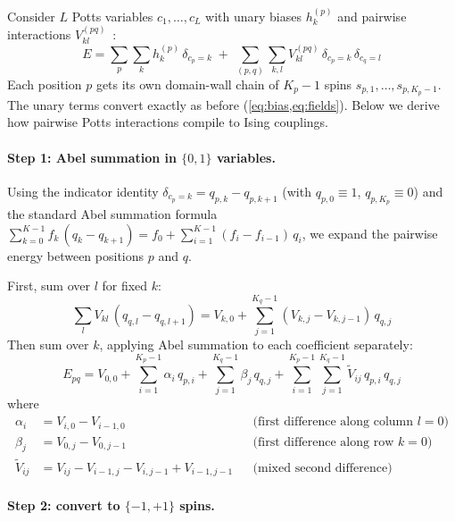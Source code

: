 \documentclass[11pt]{article}
\begin{document}
Consider $L$ Potts variables $c_1, \ldots, c_L$ with unary biases $h^{(p)}_k$ and pairwise interactions $V^{(pq)}_{kl}$~\cite{chancellor2019dwc, berwald2022dwc}:
\begin{equation}\label{eq:potts-energy}
  E = \sum_p \sum_k h^{(p)}_k \,\delta_{c_p=k}
    \;+\; \sum_{(p,q)} \sum_{k,l} V^{(pq)}_{kl}\,\delta_{c_p=k}\,\delta_{c_q=l}
\end{equation}
Each position $p$ gets its own domain-wall chain of $K_p{-}1$ spins $s_{p,1},\ldots,s_{p,K_p-1}$.
The unary terms convert exactly as before (\cref{eq:bias,eq:fields}).
Below we derive how pairwise Potts interactions compile to Ising couplings.

\paragraph{Step 1: Abel summation in $\{0,1\}$ variables.}

Using the indicator identity $\delta_{c_p=k} = q_{p,k} - q_{p,k+1}$ (with $q_{p,0}\equiv 1$, $q_{p,K_p}\equiv 0$) and the standard Abel summation formula
$\sum_{k=0}^{K-1} f_k\,(q_k - q_{k+1}) = f_0 + \sum_{i=1}^{K-1}(f_i - f_{i-1})\,q_i$,
we expand the pairwise energy between positions $p$ and $q$.

First, sum over $l$ for fixed $k$:
\begin{equation}
  \sum_l V_{kl}\,(q_{q,l} - q_{q,l+1})
  = V_{k,0} + \sum_{j=1}^{K_q-1}(V_{k,j} - V_{k,j-1})\,q_{q,j}
\end{equation}
Then sum over $k$, applying Abel summation to each coefficient separately:
\begin{equation}\label{eq:abel-result}
  E_{pq}
  = V_{0,0}
    + \sum_{i=1}^{K_p-1} \alpha_i\, q_{p,i}
    + \sum_{j=1}^{K_q-1} \beta_j\, q_{q,j}
    + \sum_{i=1}^{K_p-1}\sum_{j=1}^{K_q-1} \widetilde{V}_{ij}\, q_{p,i}\, q_{q,j}
\end{equation}
where
\begin{align}
  \alpha_i &= V_{i,0} - V_{i-1,0}
    & &\text{(first difference along column $l{=}0$)} \label{eq:alpha}\\
  \beta_j &= V_{0,j} - V_{0,j-1}
    & &\text{(first difference along row $k{=}0$)} \label{eq:beta}\\[4pt]
  \widetilde{V}_{ij} &= V_{ij} - V_{i-1,j} - V_{i,j-1} + V_{i-1,j-1}
    & &\text{(mixed second difference)} \label{eq:mixed-diff}
\end{align}

\paragraph{Step 2: convert to $\{-1,+1\}$ spins.}
\end{document}
